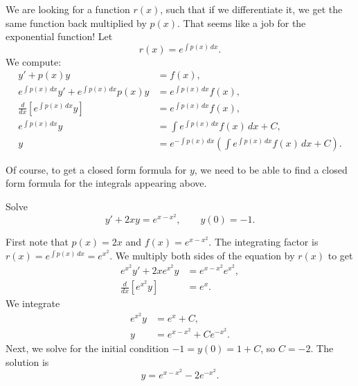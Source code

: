 We are looking for a function $r(x)$, such that if
we differentiate it, we get the same function back multiplied by $p(x)$.
That seems like a job for the exponential function!  Let
\begin{equation*}
r(x) = e^{\int p(x) \,dx} .
\end{equation*}
We compute:
\begin{equation*}
\begin{aligned}
y' + p(x) y &= f(x) , \\
e^{\int p(x) \,dx} y' + e^{\int p(x) \,dx} p(x) y & = e^{\int p(x) \,dx} f(x) , \\
\frac{d}{dx}\left[ e^{\int p(x) \,dx} y \right] & = e^{\int p(x) \,dx} f(x) , \\
e^{\int p(x) \,dx} y & = \int e^{\int p(x) \,dx} f(x) \,dx + C , \\
y & = e^{-\int p(x) \,dx} \left( \int e^{\int p(x) \,dx} f(x) \,dx + C \right) .
\end{aligned}
\end{equation*}

Of course, to get a closed form formula for $y$,
we need to be able to find a
closed form formula for the integrals appearing above.

\begin{example}
Solve
\begin{equation*}
y' + 2xy = e^{x-x^2}, \qquad y(0) = -1 .
\end{equation*}

First note that $p(x) = 2x$ and $f(x) = e^{x-x^2}$.
The integrating factor is $r(x) = e^{\int p(x)\, dx} = e^{x^2}$.
We multiply both sides of the equation by $r(x)$ to get
\begin{equation*}
\begin{aligned}
e^{x^2} y' + 2xe^{x^2}y & = e^{x-x^2} e^{x^2} , \\
\frac{d}{dx} \left[ e^{x^2} y \right] &= e^x .
\end{aligned}
\end{equation*}
We integrate
\begin{equation*}
\begin{aligned}
e^{x^2} y &= e^x +C , \\
y &= e^{x-x^2} + C e^{-x^2} .
\end{aligned}
\end{equation*}
Next, we solve for the initial condition $-1 = y(0) = 1 + C$, so $C=-2$.
The solution is
\begin{equation*}
y = e^{x-x^2} - 2 e^{-x^2} .
\end{equation*}
\end{example}

